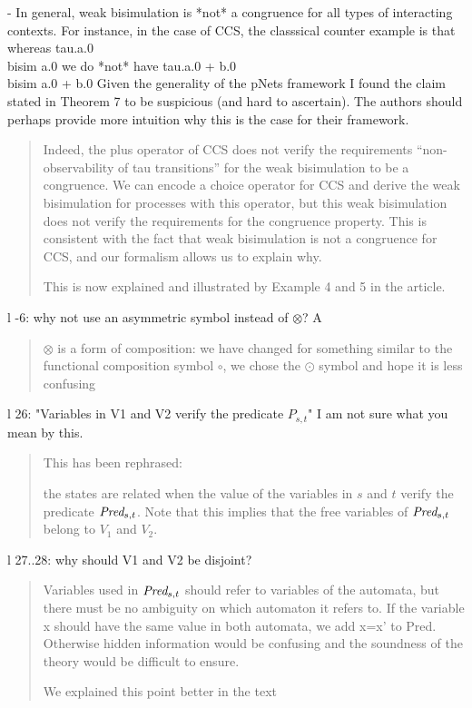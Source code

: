 \documentclass{article}
\begin{document}
- In general, weak bisimulation is *not* a congruence for all types of interacting contexts.  For instance, in the case of CCS, the classsical counter example is that whereas 
tau.a.0  \\bisim  a.0
we do *not* have
tau.a.0 + b.0 \\bisim  a.0 + b.0 
Given the generality of the pNets framework I found the claim stated in Theorem 7 to be suspicious (and hard to ascertain).  The authors should perhaps provide more intuition why this is the case for their framework.

\begin{quote}
Indeed, the plus operator of CCS does not verify the requirements ``non-observability of tau transitions'' for the weak bisimulation to be a congruence. 
We can encode a choice operator for CCS and derive the weak bisimulation for processes with this operator, 
but this weak bisimulation does not verify the requirements for the congruence property. This is consistent with the fact that weak bisimulation is not a congruence for CCS, and our formalism allows us to explain why.

This is now explained and illustrated by Example 4 and 5 in the article.
\end{quote}

l -6: why not use an asymmetric symbol instead of $\otimes$? 
A%
\begin{quote}
$\otimes$ is a form of composition: we have changed for something similar to the functional composition symbol $\circ$, we chose the $\odot$ symbol and hope it is less confusing
\end{quote}

l 26: "Variables in V1 and V2 verify the predicate $P_{s,t}$" I am not sure what you mean by this.
\begin{quote}
This has been rephrased:

the states are related when the value of the variables in $s$ and $t$  verify the predicate $\Pred_{s,t}$. Note that this implies that the free variables of  $\Pred_{s,t}$ belong to $V_1$ and $V_2$.

\end{quote}

l 27..28: why should V1 and V2 be disjoint?
\begin{quote}
Variables used in $\Pred_{s,t}$ should refer to variables of the automata, but there must be no ambiguity on which automaton it refers to. If the variable x should have the same value in both automata, we add x=x' to Pred. Otherwise hidden information would be confusing and the soundness of the theory would be difficult to ensure.

We explained this point better in the text
\end{quote}
\end{document}

